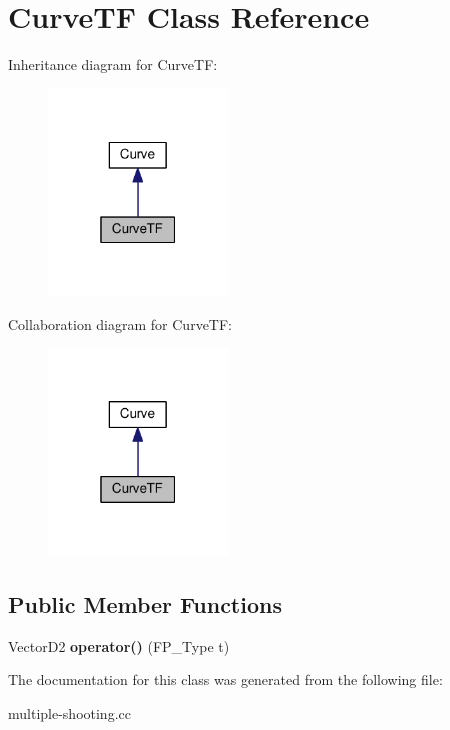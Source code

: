 \hypertarget{classCurveTF}{}\section{Curve\+TF Class Reference}
\label{classCurveTF}


Inheritance diagram for Curve\+TF\+:\nopagebreak
\begin{figure}[H]
\begin{center}
\leavevmode
\includegraphics[width=135pt]{classCurveTF__inherit__graph}
\end{center}
\end{figure}


Collaboration diagram for Curve\+TF\+:\nopagebreak
\begin{figure}[H]
\begin{center}
\leavevmode
\includegraphics[width=135pt]{classCurveTF__coll__graph}
\end{center}
\end{figure}
\subsection*{Public Member Functions}
\begin{DoxyCompactItemize}
\item 
\mbox{\label{classCurveTF_a240e9a0f02f6a42a13dcecb1a35a7756}} 
Vector\+D2 {\bfseries operator()} (F\+P\+\_\+\+Type t)
\end{DoxyCompactItemize}


The documentation for this class was generated from the following file\+:\begin{DoxyCompactItemize}
\item 
multiple-\/shooting.\+cc\end{DoxyCompactItemize}
